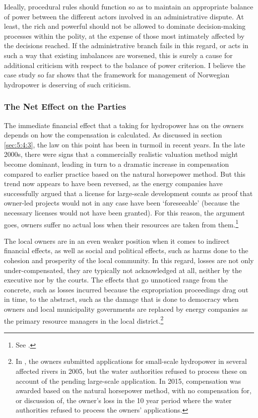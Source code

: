 Ideally, procedural rules should function so as to maintain an appropriate balance of power between the different actors involved in an administrative dispute. At least, the rich and powerful should not be allowed to dominate decision-making processes within the polity, at the expense of those most intimately affected by the decisions reached. If the administrative branch fails in this regard, or acts in such a way that existing imbalances are worsened, this is surely a cause for additional criticism with respect to the balance of power criterion. I believe the case study so far shows that the framework for management of Norwegian hydropower is deserving of such criticism.

\subsubsection{The Net Effect on the Parties}\label{sec:5:7:2}

The immediate financial effect that a taking for hydropower has on the owners depends on how the compensation is calculated. As discussed in section \ref{sec:5:4:3}, the law on this point has been in turmoil in recent years. In the late 2000s, there were signs that a commercially realistic valuation method might become dominant, leading in turn to a dramatic increase in compensation compared to earlier practice based on the natural horsepower method. But this trend now appears to have been reversed, as the energy companies have successfully argued that a license for large-scale development counts as proof that owner-led projects would not in any case have been `foreseeable' (because the necessary licenses would not have been granted). For this reason, the argument goes, owners suffer no actual loss when their resources are taken from them.\footnote{See \cite{otra13}.}

The local owners are in an even weaker position when it comes to indirect financial effects, as well as social and political effects, such as harms done to the cohesion and prosperity of the local community. In this regard, losses are not only under-compensated, they are typically not acknowledged at all, neither by the executive nor by the courts. The effects that go unnoticed range from the concrete, such as losses incurred because the expropriation proceedings drag out in time, to the abstract, such as the damage that is done to democracy when owners and local municipality governments are replaced by energy companies as the primary resource managers in the local district.\footnote{In \cite{smibelg15}, the owners submitted applications for small-scale hydropower in several affected rivers in 2005, but the water authorities refused to process these on account of the pending large-scale application. In 2015, compensation was awarded based on the natural horsepower method, with no compensation for, or discussion of, the owner's loss in the 10 year period where the water authorities refused to process the owners' applications.}


